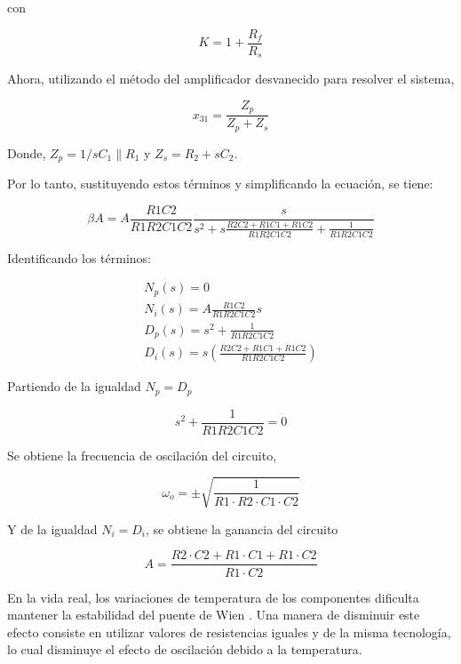 con

\begin{equation}
  K = 1 + \frac{R_f}{R_s}
  \label{eq:ganancia-no-inversor}
\end{equation}

Ahora, utilizando el método del amplificador desvanecido para resolver el sistema,

\begin{equation}
  x_{31} = \frac{Z_p}{Z_p + Z_s}
\end{equation}

Donde, $Z_p= 1/sC_1 \parallel R_1$ y $Z_s=R_2 + sC_2$.

Por lo tanto, sustituyendo estos términos y simplificando la ecuación, se tiene:

\begin{equation}
  \beta A = A \frac{R1C2}{R1R2C1C2} \frac{s}{s^2 + s \frac{R2C2 + R1C1 + R1C2}{R1R2C1C2} + \frac{1}{R1R2C1C2}}
\end{equation}

Identificando los términos:

\begin{align}
  N_p(s) = 0 \\
  N_i(s) = A \frac{R1C2}{R1R2C1C2}s \\
  D_p(s) = s^2 + \frac{1}{R1R2C1C2} \\
  D_i(s) = s \left( \frac{R2C2 + R1C1 + R1C2}{R1R2C1C2} \right)
\end{align}

Partiendo de la igualdad $N_p = D_p$

\begin{equation}
  s^2 + \frac{1}{R1R2C1C2} = 0
\end{equation}

Se obtiene la frecuencia de oscilación del circuito,

\begin{equation}
  \omega_o = \pm \sqrt{\frac{1}{R1 \cdot R2 \cdot C1 \cdot C2}}
\end{equation}

Y de la igualdad $N_i = D_i$, se obtiene la ganancia del circuito

\begin{equation}
  A = \frac{R2 \cdot C2 + R1 \cdot C1 + R1 \cdot C2}{R1 \cdot C2}
\end{equation}

En la vida real, los variaciones de temperatura de los componentes dificulta mantener la estabilidad del puente de Wien \cite{herrera-osciladores}. Una manera de disminuir este efecto consiste en utilizar valores de resistencias iguales y de la misma tecnología, lo cual disminuye el efecto de oscilación debido a la temperatura.

